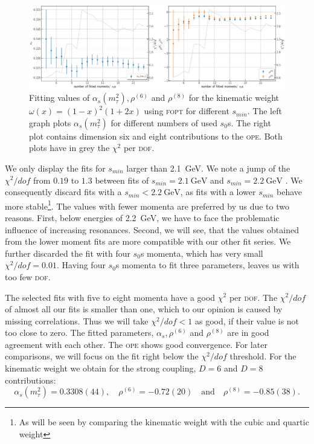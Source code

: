 \documentclass[../../index.tex]{subfiles}
\begin{document}
\begin{figure}
  \centering \includegraphics[width=\textwidth]{./images/fitWKinAlD6D8.eps}
  \caption{Fitting values of \(\alpha_s(m_\tau^2), \rho^{(6)}\) and
    \(\rho^{(8)}\) for the kinematic weight \(\omega(x)=(1-x)^2(1+2x)\) using
    \textsc{fopt} for different \(s_{min}\). The left graph plots
    \(\alpha_s(m_\tau^2)\) for different numbers of used \(s_0\)s. The right
    plot contains dimension six and eight contributions to the \textsc{ope}.
    Both plots have in grey the \(\chi^2\) per \textsc{dof}.}
  \label{fig:fitWKinAlD6D8}
\end{figure}

We only display the fits for \(s_{min}\) larger than \SI{2.1}{\giga\eV}. We note
a jump of the \(\chi^2/dof\) from \(0.19\) to \(1.3\) between fits of
\(s_{min}=\SI{2.1}{\giga\eV}\) and \(s_{min}=\SI{2.2}{\giga\eV}\) . We
consequently discard fits with a \(s_{min}<\SI{2.2}{\giga\eV}\), as fits with a
lower \(s_{min}\) behave more stable\footnote{As will be seen by comparing the
  kinematic weight with the cubic and quartic weight}. The values with fewer
momenta are preferred by us due to two reasons. First, below energies of
\SI{2.2}{\giga\eV}, we have to face the problematic influence of increasing
resonances. Second, we will see, that the values obtained from the lower moment
fits are more compatible with our other fit series. We further discarded the fit
with four \(s_0\)s momenta, which has very small \(\chi^2/dof=0.01\). Having
four \(s_0\)s momenta to fit three parameters, leaves us with too few
\textsc{dof}.

The selected fits with five to eight momenta have a good \(\chi^2\) per
\textsc{dof}. The \(\chi^2/dof\) of almost all our fits is smaller than one,
which to our opinion is caused by missing correlations. Thus we will take
\(\chi^2/dof<1\) as good, if their value is not too close to zero. The fitted
parameters, \(\alpha_s, \rho^{(6)}\) and \(\rho^{(8)}\) are in good agreement
with each other. The \textsc{ope} shows good convergence. For later comparisons,
we will focus on the fit right below the \(\chi^2/dof\) threshold. For the
kinematic weight we obtain for the strong coupling, \(D=6\) and \(D=8\)
contributions:
\begin{equation}
  \label{eq:wKinResult}
  \alpha_s(m_\tau^2) = 0.3308(44), \quad \rho^{(6)} = -0.72(20) \quad \text{and} \quad
  \rho^{(8)} = -0.85(38).
\end{equation}
\end{document}
